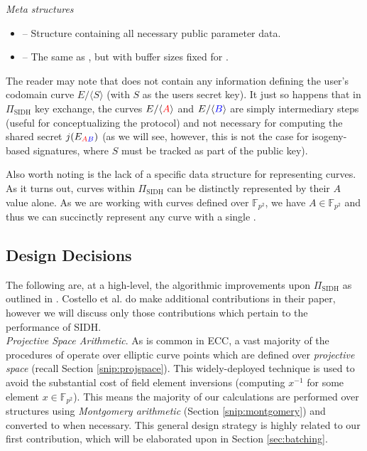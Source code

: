 \noindent
\emph{Meta structures}
\begin{itemize}
	\item {} -- Structure containing all necessary public parameter data.
	\item {} -- The same as , but with buffer sizes fixed for .
\end{itemize}

The reader may note that  does not contain any information defining the user's codomain curve $E/\langle S \rangle$ (with $S$ as the users secret key). It just so happens that in $\Pi_{\text{SIDH}}$ key exchange, the curves $E/\langle \textcolor{red}{A} \rangle$ and $E/\langle \textcolor{blue}{B} \rangle$ are simply intermediary steps (useful for conceptualizing the protocol) and not necessary for computing the shared secret $j(E_{\textcolor{red}{A}\textcolor{blue}{B}})$ (as we will see, however, this is not the case for isogeny-based signatures, where $S$ must be tracked as part of the public key).

Also worth noting is the lack of a specific data structure for representing curves. As it turns out, curves within $\Pi_{\text{SIDH}}$ can be distinctly represented by their $A$ value alone. As we are working with curves defined over $\mathbb{F}_{p^2}$, we have $A \in \mathbb{F}_{p^2}$ and thus we can succinctly represent any curve with a single  \cite{sidhcode}.

\subsection{\sidh Design Decisions}
\label{subsec:design}

The following are, at a high-level, the algorithmic improvements upon $\Pi_{\text{SIDH}}$ as outlined in \cite{effalg}. Costello et al. do make additional contributions in their paper, however we will discuss only those contributions which pertain to the performance of SIDH.\\

\noindent
\emph{Projective Space Arithmetic}. As is common in ECC, a vast majority of the procedures of \sidh operate over elliptic curve points which are defined over \emph{projective space} (recall Section \ref{snip:projspace}). This widely-deployed technique is used to avoid the substantial cost of field element inversions (computing $x^{-1}$ for some element $x \in \mathbb{F}_{p^2}$). This means the majority of our calculations are performed over  structures using \emph{Montgomery arithmetic} (Section \ref{snip:montgomery}) and converted to  when necessary. This general design strategy is highly related to our first contribution, which will be elaborated upon in Section \ref{sec:batching}.

